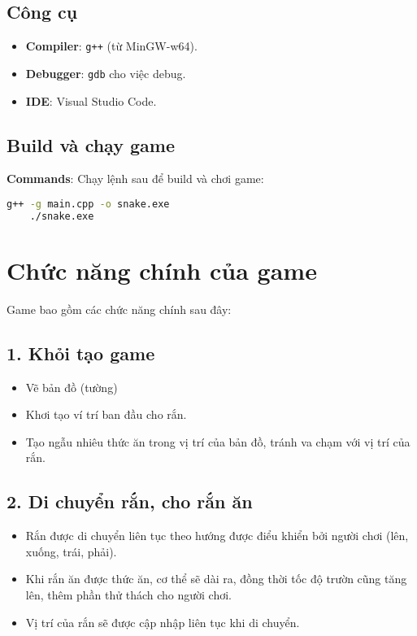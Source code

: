 \documentclass[12pt]{report}
\begin{document}
\subsection*{Công cụ}
\begin{itemize}
    \item \textbf{Compiler}: \texttt{g++} (từ MinGW-w64).
    \item \textbf{Debugger}: \texttt{gdb} cho việc debug.
    \item \textbf{IDE}: Visual Studio Code.
\end{itemize}

\subsection*{Build và chạy game}
\textbf{Commands}: Chạy lệnh sau để build và chơi game:
\begin{lstlisting}[language=bash]
    g++ -g main.cpp -o snake.exe
    ./snake.exe
\end{lstlisting}

\section{Chức năng chính của game}
Game bao gồm các chức năng chính sau đây:
\subsection*{1. Khỏi tạo game}
\begin{itemize}
    \item Vẽ bản đồ (tường)
    \item Khơi tạo ví trí ban đầu cho rắn.
    \item Tạo ngẫu nhiêu thức ăn trong vị trí của bản đồ, tránh va chạm với vị trí của rắn.
\end{itemize}

\subsection*{2. Di chuyển rắn, cho rắn ăn}
\begin{itemize}
    \item Rắn được di chuyển liên tục theo hướng được điểu khiển bởi người chơi (lên, xuống, trái, phải).
    \item Khi rắn ăn được thức ăn, cơ thể sẽ dài ra, đồng thời tốc độ trườn cũng tăng lên, thêm phần thử thách cho người chơi.
    \item Vị trí của rắn sẽ được cập nhập liên tục khi di chuyển.
\end{itemize}
\end{document}
